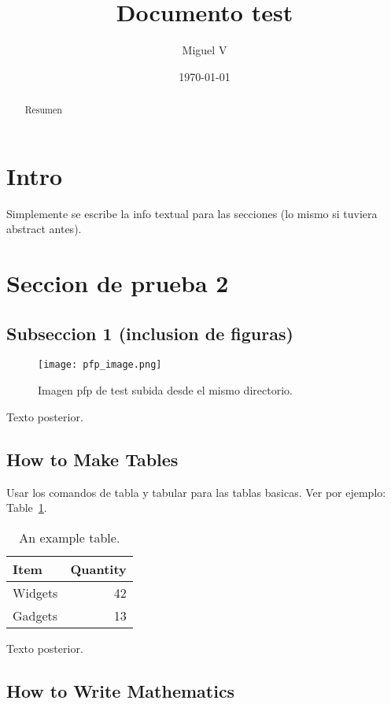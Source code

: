 \documentclass[a4paper]{article}
\title{Documento test}
\author{Miguel V}
\date{\today}
\begin{document}
\maketitle

\begin{abstract}
    Resumen
\end{abstract}

\section{Intro}

Simplemente se escribe la info textual para las secciones (lo mismo si tuviera abstract antes).

\section{Seccion de prueba 2}
\subsection{Subseccion 1 (inclusion de figuras)}
\begin{figure}
    \centering
    \texttt{[image: pfp\_image.png]}
    \caption{\label{fig:pfp_image}Imagen pfp de test subida desde el mismo directorio.}
\end{figure}

Texto posterior.

\subsection{How to Make Tables}

Usar los comandos de tabla y tabular para las tablas basicas. Ver por ejemplo: Table~\ref{tab:widgets}.
\begin{table}
    \centering
    \begin{tabular}{l|r}
        Item & Quantity \\\hline
        Widgets & 42 \\
        Gadgets & 13
    \end{tabular}
    \caption{\label{tab:widgets}An example table.}
\end{table}

Texto posterior.

\subsection{How to Write Mathematics}
\end{document}
